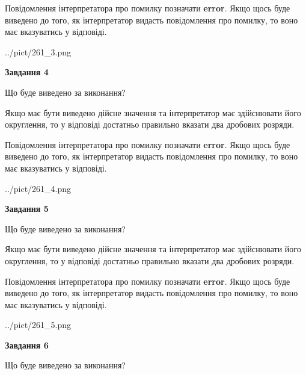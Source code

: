 \documentclass[12pt, ukrainian]{article}
\begin{document}
{\begin {Large}
Повідомлення інтерпретатора про помилку позначати \textbf{error}.
Якщо щось буде виведено до того, як інтерпретатор видасть повідомлення про помилку, 
то воно має вказуватись у відповіді. \par

\begin{center}
	{../pict/261_3.png}
\end{center}
\newpage

{\begin {center}\textbf{Завдання 4}\end {center}}\par
Що буде виведено за виконання? \par

Якщо має бути виведено дійсне значення та інтерпретатор має здійснювати його округлення, 
то у відповіді достатньо правильно вказати два дробових розряди.

Повідомлення інтерпретатора про помилку позначати \textbf{error}.
Якщо щось буде виведено до того, як інтерпретатор видасть повідомлення про помилку, 
то воно має вказуватись у відповіді. \par

\begin{center}
	{../pict/261_4.png}
\end{center}
\newpage

{\begin {center}\textbf{Завдання 5}\end {center}}\par
Що буде виведено за виконання? \par

Якщо має бути виведено дійсне значення та інтерпретатор має здійснювати його округлення, 
то у відповіді достатньо правильно вказати два дробових розряди.

Повідомлення інтерпретатора про помилку позначати \textbf{error}.
Якщо щось буде виведено до того, як інтерпретатор видасть повідомлення про помилку, 
то воно має вказуватись у відповіді. \par

\begin{center}
	{../pict/261_5.png}
\end{center}
\newpage

{\begin {center}\textbf{Завдання 6}\end {center}}\par
Що буде виведено за виконання? \par


\end{Large}}
\end{document}
